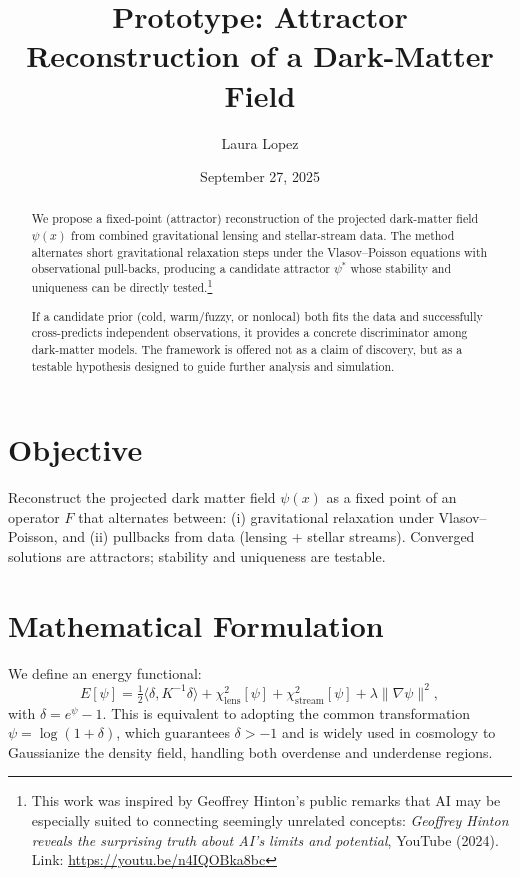 \documentclass[11pt]{article}
\title{Prototype: Attractor Reconstruction of a Dark-Matter Field}
\author{Laura Lopez}
\date{September 27, 2025}
\begin{document}
\maketitle

\begin{abstract}
We propose a fixed-point (attractor) reconstruction of the projected dark-matter field $\psi(x)$
from combined gravitational lensing and stellar-stream data. The method alternates short gravitational
relaxation steps under the Vlasov--Poisson equations with observational pull-backs, producing a candidate
attractor $\psi^\ast$ whose stability and uniqueness can be directly tested.\footnote{This work was inspired
by Geoffrey Hinton’s public remarks that AI may be especially suited to connecting seemingly unrelated concepts:
\emph{Geoffrey Hinton reveals the surprising truth about AI’s limits and potential}, YouTube (2024).
Link: \url{https://youtu.be/n4IQOBka8bc}}%

\par
If a candidate prior (cold, warm/fuzzy, or nonlocal) both fits the data and successfully cross-predicts
independent observations, it provides a concrete discriminator among dark-matter models.
The framework is offered not as a claim of discovery, but as a testable hypothesis designed to guide
further analysis and simulation.
\end{abstract}

\section{Objective}
Reconstruct the projected dark matter field $\psi(x)$ as a fixed point of an operator $F$ that alternates between:
(i) gravitational relaxation under Vlasov--Poisson, and (ii) pullbacks from data (lensing + stellar streams).
Converged solutions are attractors; stability and uniqueness are testable.

\section{Mathematical Formulation}
We define an energy functional:
\begin{equation}
E[\psi] = \tfrac{1}{2}\langle \delta, K^{-1}\delta \rangle
        + \chi^2_{\text{lens}}[\psi]
        + \chi^2_{\text{stream}}[\psi]
        + \lambda \|\nabla \psi\|^2,
\end{equation}
with $\delta = e^\psi - 1$.
This is equivalent to adopting the common transformation $\psi = \log(1+\delta)$, which guarantees $\delta > -1$
and is widely used in cosmology to Gaussianize the density field, handling both overdense and underdense regions.
\end{document}
